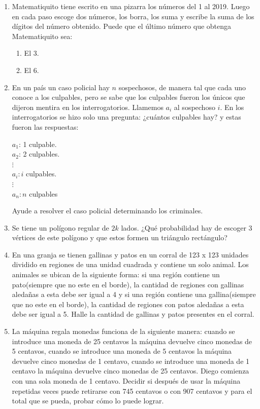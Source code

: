 \documentclass{book}
\begin{document}
\begin{enumerate}
\begin{enumerate}
        \end{enumerate}
        \item Matematiquito tiene escrito en una pizarra los números del 1 al 2019. Luego en cada paso escoge dos números, los borra, los suma y escribe la suma de los dígitos del número obtenido. Puede que el último número que obtenga Matematiquito sea:
        \begin{enumerate}
            \item El 3.
            \item El 6.
        \end{enumerate}
        \item En un país un caso policial hay $n$ sospechosos, de manera tal que cada uno conoce a los culpables, pero se sabe que los culpables fueron los únicos que dijeron mentira en los interrogatorios. Llamemos $a_i$ al sospechoso $i$. En los interrogatorios se hizo solo una pregunta: ¿cuántos culpables hay? y estas fueron las respuestas:
        \begin{center}
            $a_1$: 1 culpable.\\
            $a_2$: 2 culpables.\\
            $\vdots$\\
            $a_i: i$ culpables.\\
            $\vdots$\\
            $a_n: n$ culpables
        \end{center}
        Ayude a resolver el caso policial determinando los criminales.
        \item Se tiene un polígono regular de $2k$ lados. ¿Qué probabilidad hay de escoger 3 vértices de este polígono y que estos formen un triángulo rectángulo?
        \item En una granja se tienen gallinas y patos en un corral de 123 x 123 unidades dividido en regiones de una unidad cuadrada y contiene un solo animal. Los animales se ubican de la siguiente forma: si una región contiene un pato(siempre que no este en el borde), la cantidad de regiones con gallinas aledañas a esta debe ser igual a 4 y si una región contiene una gallina(siempre que no este en el borde), la cantidad de regiones con patos aledañas a esta debe ser igual a 5. Halle la cantidad de gallinas y patos presentes en el corral.
        \item La máquina regala monedas funciona de la siguiente manera: cuando se introduce una moneda de 25 centavos la máquina devuelve cinco monedas de 5 centavos, cuando se introduce una moneda de 5 centavos la máquina devuelve cinco monedas de 1 centavo, cuando se introduce una moneda de 1 centavo la máquina devuelve cinco monedas de 25 centavos. Diego comienza con una sola moneda de 1 centavo. Decidir si después de usar la máquina repetidas veces puede retirarse con 745 centavos o con 907 centavos y para el total que se pueda, probar cómo lo puede lograr.

\end{enumerate}
\end{document}
